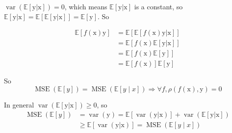 \documentclass[a4paper]{article}
\begin{document}
\begin{enumerate}
\begin{enumerate}
  $\operatorname{var} (\mathbb{E}\left[\mathrm{y}|\mathrm{x}\right]) = 0$, which means $\mathbb{E}\left[\mathrm{y}|\mathrm{x}\right]$ is a constant, so $\mathbb{E}\left[\mathrm{y}|\mathrm{x}\right] = \mathbb{E}\left[\mathbb{E}\left[\mathrm{y}|\mathrm{x}\right]\right] = \mathbb{E}[\mathrm{y}]$. So 


  \begin{equation}
    \begin{aligned}
      \mathbb{E}\left[f(\mathrm{x}) \mathrm{y} \right] & = \mathbb{E}\left[\mathbb{E}\left[f(\mathrm{x}) \mathrm{y}  | \mathrm{x}\right]\right] \\
      & = \mathbb{E}\left[f(\mathrm{x})\mathbb{E}\left[ \mathrm{y}  | \mathrm{x}\right]\right] \\
      & = \mathbb{E}\left[f(\mathrm{x})\mathbb{E}\left[ \mathrm{y}\right]\right] \\
      & = \mathbb{E}\left[f(\mathrm{x})\right] \mathbb{E}\left[ \mathrm{y}\right]
    \end{aligned} 
  \end{equation}
  
  So \begin{equation}
    \operatorname{MSE}(\mathbb{E}[y])=\operatorname{MSE}(\mathbb{E}[y \mid x]) \Longrightarrow \forall f, \rho(f(\mathrm{x}),\mathrm{y}) = 0
  \end{equation}

  In general $\operatorname{var} (\mathbb{E}\left[\mathrm{y}|\mathrm{x}\right]) \geqslant 0$, so 
  \begin{equation}
    \begin{aligned}
      \operatorname{MSE}(\mathbb{E}[y]) & = \operatorname{var}(\mathrm{y}) = \mathbb{E}\left[\operatorname{var}(\mathrm{y}|\mathrm{x})\right] + \operatorname{var} (\mathbb{E}\left[\mathrm{y}|\mathrm{x}\right])\\& \geqslant \mathbb{E}\left[\operatorname{var}(\mathrm{y}|\mathrm{x})\right]  = \operatorname{MSE}(\mathbb{E}[y \mid x])
    \end{aligned}
  \end{equation}

\end{enumerate}


\end{enumerate}
\end{document}

